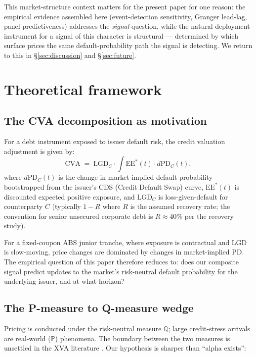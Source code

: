 \documentclass[11pt,a4paper]{article}
\begin{document}
This market-structure context matters for the present paper for one reason: the empirical evidence assembled here (event-detection sensitivity, Granger lead-lag, panel predictiveness) addresses the \emph{signal} question, while the natural deployment instrument for a signal of this character is structural --- determined by which surface prices the same default-probability path the signal is detecting. We return to this in §\ref{sec:discussion} and §\ref{sec:future}.

\section{Theoretical framework}\label{sec:theory}

\subsection{The CVA decomposition as motivation}

For a debt instrument exposed to issuer default risk, the credit valuation adjustment is given by:
\begin{equation}\label{eq:cva}
\text{CVA} \;=\; \text{LGD}_C \cdot \int \text{EE}^{*}(t) \cdot d\text{PD}_C(t),
\end{equation}
where $d\text{PD}_C(t)$ is the change in market-implied default probability bootstrapped from the issuer's CDS (Credit Default Swap) curve, $\text{EE}^{*}(t)$ is discounted expected positive exposure, and $\text{LGD}_C$ is loss-given-default for counterparty $C$ (typically $1 - R$ where $R$ is the assumed recovery rate; the convention for senior unsecured corporate debt is $R \approx 40\%$ per the \citet{moodys2024recovery} recovery study).

For a fixed-coupon ABS junior tranche, where exposure is contractual and LGD is slow-moving, price changes are dominated by changes in market-implied PD. The empirical question of this paper therefore reduces to: does our composite signal predict updates to the market's risk-neutral default probability for the underlying issuer, and at what horizon?

\subsection{The P-measure to Q-measure wedge}

Pricing is conducted under the risk-neutral measure $\mathbb{Q}$; large credit-stress arrivals are real-world ($\mathbb{P}$) phenomena. The boundary between the two measures is unsettled in the XVA literature \citep{brigomorinipallavicini2013,hullwhite2012fva,burgardkjaer2013funding}. Our hypothesis is sharper than ``alpha exists'':
\end{document}
